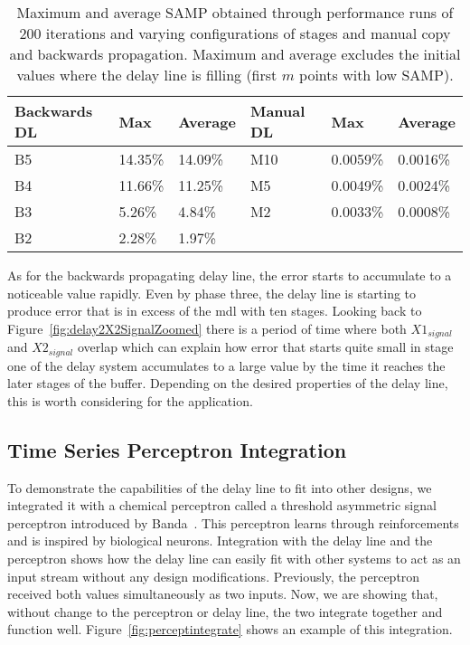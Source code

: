 \begin{table}[ht]
	\centering
	\caption[Error for Both Delay Lines]{Maximum and average SAMP obtained through performance runs of 200 iterations and varying configurations of stages and manual copy and backwards propagation. Maximum and average excludes the initial values where the delay line is filling (first $m$ points with low SAMP).}
	\label{tab:maxSAMP}
	\begin{tabular}{llllll}
	Backwards DL & Max     & Average & Manual DL & Max      & Average  \\ \hline
	B5           & 14.35\% & 14.09\% & M10       & 0.0059\% & 0.0016\% \\
	B4           & 11.66\% & 11.25\% & M5        & 0.0049\% & 0.0024\% \\
	B3           & 5.26\%  & 4.84\%  & M2        & 0.0033\% & 0.0008\% \\
	B2           & 2.28\%  & 1.97\%  & ~         & ~        & ~        \\
	\end{tabular}
\end{table}

As for the backwards propagating delay line, the error starts to accumulate to a noticeable value rapidly. Even by phase three, the delay line is starting to produce error that is in excess of the \gls{mdl} with ten stages. Looking back to Figure~\ref{fig:delay2X2SignalZoomed} there is a period of time where both $X1_{signal}$ and $X2_{signal}$ overlap which can explain how error that starts quite small in stage one of the delay system accumulates to a large value by the time it reaches the later stages of the buffer. Depending on the desired properties of the delay line, this is worth considering for the application.

\subsection{Time Series Perceptron Integration}
To demonstrate the capabilities of the delay line to fit into other designs, we integrated it with a chemical perceptron called a threshold asymmetric signal perceptron introduced by Banda~\cite{Banda2014-bp}. This perceptron learns through reinforcements and is inspired by biological neurons. Integration with the delay line and the perceptron shows how the delay line can easily fit with other systems to act as an input stream without any design modifications. Previously, the perceptron received both values simultaneously as two inputs. Now, we are showing that, without change to the perceptron or delay line, the two integrate together and function well. Figure~\ref{fig:perceptintegrate} shows an example of this integration.


